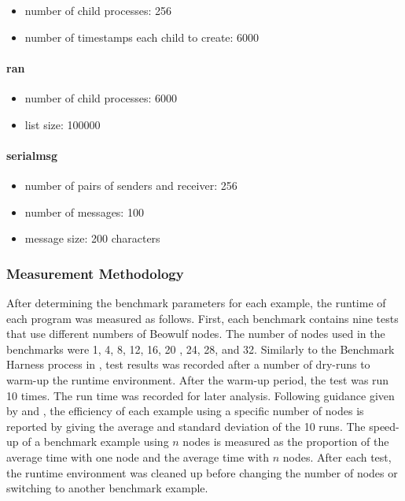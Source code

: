 \begin{itemize}
  \item number of child processes: 256
  \item number of timestamps each child to create: 6000
\end{itemize}



\paragraph{ran} 
\begin{itemize}
  \item number of child processes: 6000
  \item list size: 100000
\end{itemize}


\paragraph{serialmsg}

\begin{itemize}
  \item number of pairs of senders and receiver: 256
  \item number of messages: 100
  \item message size: 200 characters
\end{itemize}

\subsubsection{Measurement Methodology}

After determining the benchmark parameters for each example, the runtime of 
each program was measured as follows.  First, each benchmark contains nine 
tests that use different numbers of Beowulf nodes.  The number of nodes 
used in the benchmarks were 1, 4, 8, 12, 16, 20 , 24, 28, and 32.  Similarly 
to the Benchmark Harness process in \citep{blackburn2006dacapo}, test results 
was recorded after a number of dry-runs to warm-up the runtime environment.  
After the warm-up period, the test was run 10 times.  The 
run time was recorded for later analysis.  Following guidance given by 
\citet{Fleming} and \citet{HePa06}, the efficiency of each example 
using a specific number of nodes is reported by giving the average and standard 
deviation of the 10 runs.  The speed-up of a benchmark example using $n$ nodes 
is measured as the proportion of the average time with one node and the average 
time with $n$ nodes.  After each test, the runtime environment was cleaned up  
before changing the number of nodes or switching to another benchmark example.

